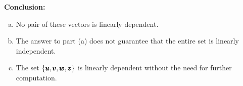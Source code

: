 \begin{solution}
        \textbf{Conclusion:}
        
        \begin{enumerate}[(a)]
            \item No pair of these vectors is linearly dependent.
            \item The answer to part (a) does not guarantee that the entire set is linearly independent.
            \item The set $\{\pmb{u}, \pmb{v}, \pmb{w}, \pmb{z}\}$ is linearly dependent without the need for further computation.
        \end{enumerate}

\end{solution}

